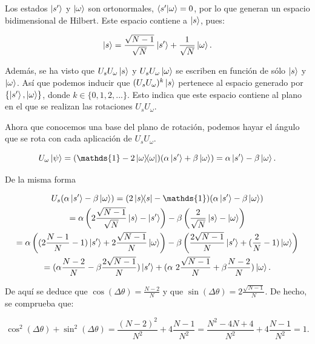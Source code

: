Los estados $\ket{s^\prime}$ y $\ket{\omega}$ son ortonormales, $\braket{s^\prime}{\omega} = 0$, por lo que generan un espacio bidimensional de Hilbert. Este espacio contiene a $\ket{s}$, pues:

\begin{equation}
    \ket{s} = \frac{\sqrt{N-1}}{\sqrt{N}}\ket{s^\prime} + \frac{1}{\sqrt{N}}\ket{\omega} .
\end{equation}

Además, se ha visto que $U_s U_\omega \ket{s}$ y $U_s U_\omega \ket{\omega}$ se escriben en función de sólo $\ket{s}$ y $\ket{\omega}$. Así que podemos inducir que $(U_s U_\omega)^k \ket{s}$ pertenece al espacio generado por $\{\ket{s^\prime}, \ket{\omega}\}$, donde $k \in \{0, 1, 2, ...\}$. Esto indica que este espacio contiene al plano en el que se realizan las rotaciones $U_s U_\omega$.

Ahora que conocemos una base del plano de rotación, podemos hayar el ángulo que se rota con cada aplicación de $U_s U_\omega$.

\begin{equation}
    U_\omega \ket{\psi}
    = (\mathds{1} - 2 \ketbra{\omega}{\omega}) (\alpha \ket{s^\prime} + \beta \ket{\omega})
    = \alpha \ket{s^\prime} - \beta \ket{\omega} .
\end{equation}

De la misma forma

\begin{multline}
    U_s (\alpha \ket{s^\prime} - \beta \ket{\omega})
    = (2 \ketbra{s}{s} - \mathds{1}) (\alpha \ket{s^\prime} - \beta \ket{\omega}) \\
    = \alpha \left(2 \frac{\sqrt{N-1}}{\sqrt{N}} \ket{s} - \ket{s^\prime}\right) - \beta \left(\frac{2}{\sqrt{N}} \ket{s} - \ket{\omega}\right) \\
    = \alpha \left((2\frac{N-1}{N} - 1) \ket{s^\prime} + 2\frac{\sqrt{N-1}}{N}\ket{\omega}\right)
    - \beta \left(\frac{2\sqrt{N-1}}{N}\ket{s^\prime} + (\frac{2}{N}-1)\ket{\omega}\right) \\
    = (\alpha \frac{N-2}{N} - \beta \frac{2\sqrt{N-1}}{N}) \ket{s^\prime}
    + (\alpha\ 2\frac{\sqrt{N-1}}{N} + \beta  \frac{N-2}{N}) \ket{\omega} .
\end{multline}

De aquí se deduce que $\cos(\Delta\theta) = \frac{N-2}{N}$ y que $\sin(\Delta\theta) = 2\frac{\sqrt{N-1}}{N}$. De hecho, se comprueba que:

\begin{equation}
    \cos^2(\Delta\theta)+\sin^2(\Delta\theta)
    = \frac{(N-2)^2}{N^2} + 4\frac{N-1}{N^2}
    = \frac{N^2-4N+4}{N^2} + 4\frac{N-1}{N^2}
    = 1 .
\end{equation}

